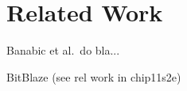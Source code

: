 \section{Related Work}\label{sec:rel_work}

Banabic et al.~do bla... 
\cite{trojan14}


BitBlaze (see rel work in chip11s2e)

\iffalse
§8	Related Work
		> Was haben andere mit S2E in ähnlicher Richtung gemacht?
		> Z.B. "Finding Trojan Message Vulnerabilities in Distributed Systems”
\fi